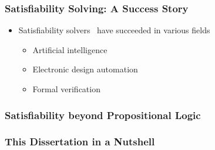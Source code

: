 \begin{frame}
      \frametitle{Satisfiability Solving: A Success Story}
      \begin{itemize}
            \item Satisfiability solvers~\cite{SATHandbook} have succeeded in various fields
                  \begin{itemize}
                        \item Artificial intelligence~\cite{Nilsson2014,Russell2020}
                        \item Electronic design automation~\cite{Marques2000,Wang2009}
                        \item Formal verification~\cite{Berard2013,Jhala2009}
                  \end{itemize}
      \end{itemize}
\end{frame}

\begin{frame}
      \frametitle{Satisfiability beyond Propositional Logic}
      \begin{figure}
            \centering
            
      \end{figure}
\end{frame}

\begin{frame}
      \frametitle{This Dissertation in a Nutshell}
      \begin{figure}
            \centering
            
      \end{figure}
\end{frame}

